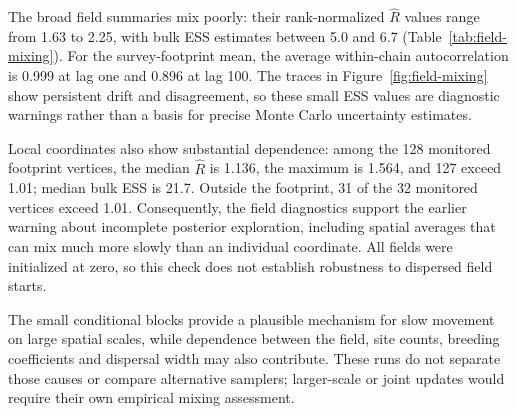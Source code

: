 The broad field summaries mix poorly: their rank-normalized $\widehat R$ values range from 1.63 to 2.25, with bulk ESS estimates between 5.0 and 6.7 (Table~\ref{tab:field-mixing}). For the survey-footprint mean, the average within-chain autocorrelation is 0.999 at lag one and 0.896 at lag 100. The traces in Figure~\ref{fig:field-mixing} show persistent drift and disagreement, so these small ESS values are diagnostic warnings rather than a basis for precise Monte Carlo uncertainty estimates.

Local coordinates also show substantial dependence: among the 128 monitored footprint vertices, the median $\widehat R$ is 1.136, the maximum is 1.564, and 127 exceed 1.01; median bulk ESS is 21.7. Outside the footprint, 31 of the 32 monitored vertices exceed 1.01. Consequently, the field diagnostics support the earlier warning about incomplete posterior exploration, including spatial averages that can mix much more slowly than an individual coordinate. All fields were initialized at zero, so this check does not establish robustness to dispersed field starts.

The small conditional blocks provide a plausible mechanism for slow movement on large spatial scales, while dependence between the field, site counts, breeding coefficients and dispersal width may also contribute. These runs do not separate those causes or compare alternative samplers; larger-scale or joint updates would require their own empirical mixing assessment.
